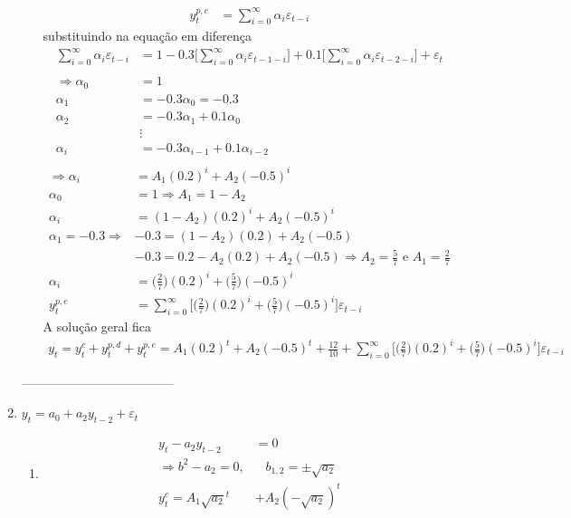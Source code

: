 \begin{enumerate}
\begin{enumerate}
	\begin{align*}
	y_t^{p,e}&=\sum\limits_{i=0}^{\infty}\alpha_i\varepsilon_{t-i}
	\end{align*}
	substituindo na equação em diferença
	\begin{align*}
	\sum\limits_{i=0}^{\infty}\alpha_i\varepsilon_{t-i}&=1-0.3\Bigg[\sum\limits_{i=0}^{\infty}\alpha_i\varepsilon_{t-1-i}\Bigg]+0.1\Bigg[\sum\limits_{i=0}^{\infty}\alpha_i\varepsilon_{t-2-i}\Bigg]+\varepsilon_t\\
	\\
	\Rightarrow \alpha_0&=1\\
	\alpha_1&=-0.3\alpha_0=-0.3\\
	\alpha_2&=-0.3\alpha_1+0.1\alpha_0\\
	&\vdots\\
	\alpha_i&=-0.3\alpha_{i-1}+0.1\alpha_{i-2}\\
	\end{align*}
	\begin{align*}
	\Rightarrow \alpha_i&=A_1(0.2)^i+A_2(-0.5)^i\\
	\alpha_0&=1 \Rightarrow A_1=1-A_2\\
	\alpha_i&=(1-A_2)(0.2)^i+A_2(-0.5)^i\\
	\alpha_1=-0.3\Rightarrow &-0.3=(1-A_2)(0.2)+A_2(-0.5)\\
	&-0.3=0.2-A_2(0.2)+A_2(-0.5)\Rightarrow A_2=\frac{5}{7} \text{ e }A_1=\frac{2}{7}\\
	\alpha_i&=\bigg(\frac{2}{7}\bigg)(0.2)^i+\bigg(\frac{5}{7}\bigg)(-0.5)^i\\
	y_t^{p,e}&=\sum\limits_{i=0}^{\infty}\Bigg[\bigg(\frac{2}{7}\bigg)(0.2)^i+\bigg(\frac{5}{7}\bigg)(-0.5)^i\Bigg]\varepsilon_{t-i}
\end{align*}
	A solução geral fica
	\begin{align*}
	y_t=y_t^c+y_t^{p,d}+y_t^{p,e}=A_1(0.2)^t+A_2(-0.5)^t+\frac{12}{10}+\sum\limits_{i=0}^{\infty}\Bigg[\bigg(\frac{2}{7}\bigg)(0.2)^i+\bigg(\frac{5}{7}\bigg)(-0.5)^i\Bigg]\varepsilon_{t-i}
	\end{align*}
\end{enumerate}

	------------------------------------

\item %
 $y_t=a_0+a_2y_{t-2}+\varepsilon_t$
 
 \begin{enumerate}
 	\item %
 	\begin{align*}
 	y_t-a_2y_{t-2}&=0\\
 	\Rightarrow b^2-a_2=0,&\;\;\; b_{1,2}=\pm \sqrt{a_2}\\
 	y_t^c=A_1\sqrt{a_2}^t&+A_2(-\sqrt{a_2})^t
 	\end{align*}
 	

\end{enumerate}
\end{enumerate}
